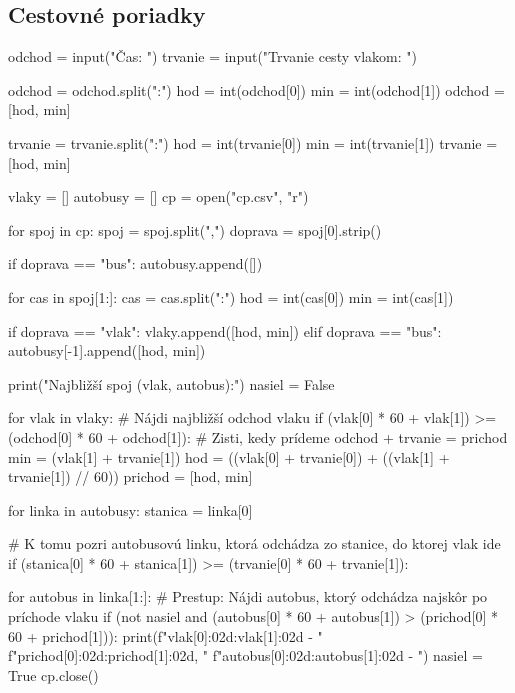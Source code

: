 \subsection{Cestovné poriadky}
\begin{solution}
odchod = input("Čas: ")
trvanie = input("Trvanie cesty vlakom: ")

odchod = odchod.split(":")
hod = int(odchod[0])
min = int(odchod[1])
odchod = [hod, min]

trvanie = trvanie.split(":")
hod = int(trvanie[0])
min = int(trvanie[1])
trvanie = [hod, min]

vlaky = []
autobusy = []
cp = open("cp.csv", "r")

for spoj in cp:
    spoj = spoj.split(",")
    doprava = spoj[0].strip()

    if doprava == "bus":
        autobusy.append([])

    for cas in spoj[1:]:
        cas = cas.split(":")
        hod = int(cas[0])
        min = int(cas[1])

        if doprava == "vlak":
            vlaky.append([hod, min])
        elif doprava == "bus":
            autobusy[-1].append([hod, min])

print("Najbližší spoj (vlak, autobus):")
nasiel = False

for vlak in vlaky:
    # Nájdi najbližší odchod vlaku
    if (vlak[0] * 60 + vlak[1]) >= (odchod[0] * 60 + odchod[1]):
        # Zisti, kedy prídeme odchod + trvanie = prichod
        min = (vlak[1] + trvanie[1]) %
        hod = ((vlak[0] + trvanie[0]) + ((vlak[1] + trvanie[1]) // 60)) %
        prichod = [hod, min]

        for linka in autobusy:
            stanica = linka[0]

            # K tomu pozri autobusovú linku, ktorá odchádza zo stanice, do ktorej vlak ide
            if (stanica[0] * 60 + stanica[1]) >= (trvanie[0] * 60 + trvanie[1]):

                for autobus in linka[1:]:
                    # Prestup: Nájdi autobus, ktorý odchádza najskôr po príchode vlaku
                    if (not nasiel and (autobus[0] * 60 + autobus[1]) > (prichod[0] * 60 + prichod[1])):
                        print(f"{vlak[0]:02d}:{vlak[1]:02d} - "
                              f"{prichod[0]:02d}:{prichod[1]:02d}, "
                              f"{autobus[0]:02d}:{autobus[1]:02d} - ")
                        nasiel = True
cp.close()
\end{solution}